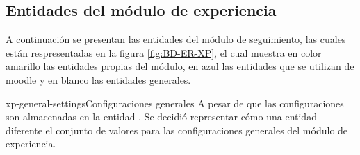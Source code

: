 \clearpage
\subsection{Entidades del módulo de experiencia}


 A continuación se presentan las entidades del módulo de seguimiento,
 las cuales están respresentadas en la figura  \ref{fig:BD-ER-XP}, 
 el cual muestra en color amarillo las entidades propias del módulo, 
 en azul las entidades que se utilizan de moodle  y en blanco las entidades generales.


    \begin{cdtEntidad}{xp-general-settings}{Configuraciones generales}{
    A pesar de que las configuraciones son almacenadas en la entidad 
    . Se decidió representar cómo una entidad diferente 
    el conjunto de valores para las configuraciones generales del módulo de 
    experiencia.}


    \end{cdtEntidad}

